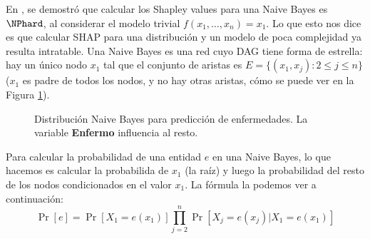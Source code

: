 En \cite{van2022tractability}, se demostró que calcular los Shapley values para una Naive Bayes es \(\NPhard\), al considerar el modelo trivial \(f(x_1,\ldots,x_n) = x_1\). Lo que esto nos dice es que calcular SHAP para una distribución y un modelo de poca complejidad ya resulta intratable. Una Naive Bayes es una red cuyo DAG tiene forma de estrella:  hay un único nodo \(x_1\) tal que el conjunto de aristas es \(E = \{(x_1, x_j) : 2 \leq j \leq n\}\) (\(x_1\) es padre de todos los nodos, y no hay otras aristas, cómo se puede ver en la Figura \ref{fig:naiveBayesExample}).  

\begin{figure}[ht]
    \centering
    \caption{Distribución Naive Bayes para predicción de enfermedades. La variable \textbf{Enfermo} influencia al resto.}
    \label{fig:naiveBayesExample}
\end{figure}


Para calcular la probabilidad de una entidad \(e\) en una Naive Bayes, lo que hacemos es calcular la probabilida de $x_1$ (la raíz) y luego la probabilidad del resto de los nodos condicionados en el valor $x_1$. La fórmula la podemos ver a continuación:
\[
\Pr[e] = \Pr[X_1 = e(x_1)] \prod_{j=2}^n \Pr[X_j = e(x_j) | X_1 = e(x_1)]
\]

